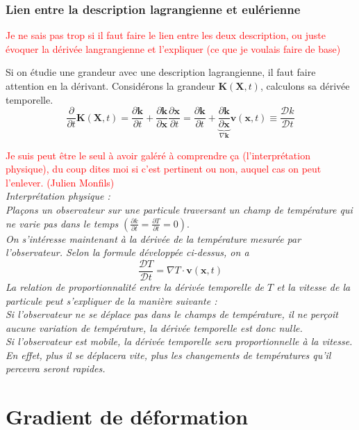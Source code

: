 \subsubsection{Lien entre la description lagrangienne et eulérienne}

\textcolor{red}{Je ne sais pas trop si il faut faire le lien entre les deux description, ou juste évoquer la dérivée langrangienne et l'expliquer (ce que je voulais faire de base)}

Si on étudie une grandeur avec une description lagrangienne, il faut faire attention en la dérivant. Considérons la grandeur $\mathbf{K}(\mathbf{X}, t)$, calculons sa dérivée temporelle.
\begin{equation*}
    \frac{\partial}{\partial t} \mathbf{K}(\mathbf{X}, t) = \frac{\partial \mathbf{k}}{\partial t} + \frac{\partial \mathbf{k}}{\partial \mathbf{x}} \frac{\partial  \mathbf{x}}{\partial t} = \frac{\partial \mathbf{k}}{\partial t} + \underbrace{\frac{\partial \mathbf{k}}{\partial \mathbf{x}}}_{\nabla \mathbf{k}} \mathbf{v}(\mathbf{x}, t) \equiv \frac{\mathcal{D} k}{\mathcal{D} t}
\end{equation*}

\textcolor{red}{Je suis peut être le seul à avoir galéré à comprendre ça (l'interprétation physique), du coup dites moi si c'est pertinent ou non, auquel cas on peut l'enlever. (Julien Monfils)}\\

\textit{Interprétation physique :}
\\

\textit{
Plaçons un observateur sur une particule traversant un champ de température qui ne varie pas dans le temps} $(\frac{\partial k}{\partial t} = \frac{\partial T}{\partial t} = 0)$.\\

\textit{On s'intéresse maintenant à la dérivée de la température mesurée par l'observateur. Selon la formule développée ci-dessus, on a}
\begin{equation*}
    \frac{\mathcal{D} T}{\mathcal{D} t} = \nabla T \cdot \mathbf{v}(\mathbf{x}, t)
\end{equation*}
\textit{La relation de proportionnalité entre la dérivée temporelle de $T$ et la vitesse de la particule peut s'expliquer de la manière suivante :}\\

\textit{Si l'observateur ne se déplace pas dans le champs de température, il ne perçoit aucune variation de température, la dérivée temporelle est donc nulle.}\\

\textit{Si l'observateur est mobile, la dérivée temporelle sera proportionnelle à la vitesse. En effet, plus il se déplacera vite, plus les changements de températures qu'il percevra seront rapides.}

\section{Gradient de déformation}
